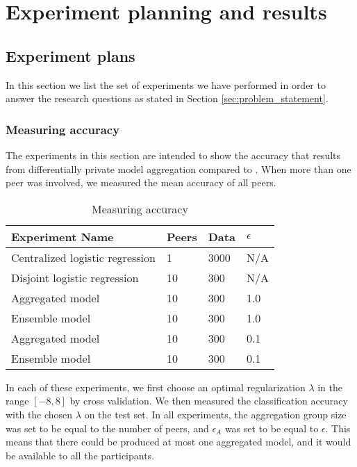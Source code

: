 
\chapter{Experiment planning and results}
\label{ch:experiments_and_results}

\section{Experiment plans}
\label{sec:experiment_plan}

In this section we list the set of experiments we have performed in order to answer the research questions as stated in Section \ref{sec:problem_statement}. 


\subsection{Measuring accuracy}

The experiments in this section are intended to show the accuracy that results from differentially private model aggregation compared to . When more than one peer was involved, we measured the mean accuracy of all peers.

\begin{table}[h]
	\centering
	\label{tab:experiment_accuracy_measuring}
	\begin{tabular}{|l|l|l|l|}
		{\bf Experiment Name}           & {\bf Peers} & {\bf Data} & {\bf $\epsilon$} \\
		\hline
		Centralized logistic regression & 1           & 3000       & N/A              \\
		Disjoint logistic regression    & 10          & 300        & N/A              \\
		Aggregated model                & 10          & 300        & 1.0              \\
		Ensemble model                  & 10          & 300        & 1.0              \\
		Aggregated model                & 10          & 300        & 0.1              \\
		Ensemble model  & 10    & 300        & 0.1             
	\end{tabular}
	\caption{Measuring accuracy}
\end{table}

In each of these experiments, we first choose an optimal  regularization $\lambda$ in the range $[-8, 8]$ by cross validation. We then measured the classification accuracy with the chosen $\lambda$ on the test set. In all experiments, the aggregation group size was set to be equal to the number of peers, and $\epsilon_{A}$ was set to be equal to $\epsilon$. This means that there could be produced at most one aggregated model, and it would be available to all the participants.

